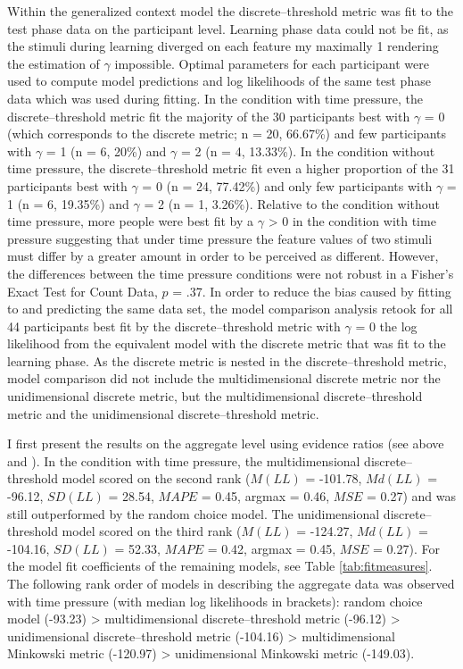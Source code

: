 \documentclass[a4paper,man,natbib]{apa6}
\begin{document}
Within the generalized context model \citep{nosofsky1989further} the discrete--threshold metric was fit to the test phase data on the participant level. Learning phase data could not be fit, as the stimuli during learning diverged on each feature my maximally 1 rendering the estimation of $\gamma$ impossible. Optimal parameters for each participant were used to compute model predictions and log likelihoods of the same test phase data which was used during fitting. In the condition with time pressure, the discrete--threshold metric fit the majority of the 30 participants best with $\gamma$ = 0 (which corresponds to the discrete metric; n = 20, 66.67\%) and few participants with $\gamma$ = 1 (n = 6, 20\%) and $\gamma$ = 2 (n = 4, 13.33\%). In the condition without time pressure, the discrete--threshold metric fit even a higher proportion of the 31 participants best with $\gamma$ = 0 (n = 24, 77.42\%) and only few participants with $\gamma$ = 1 (n = 6, 19.35\%) and $\gamma$ = 2 (n = 1, 3.26\%). Relative to the condition without time pressure, more people were best fit by a $\gamma$ > 0 in the condition with time pressure suggesting that under time pressure the feature values of two stimuli must differ by a greater amount in order to be perceived as different. However, the differences between the time pressure conditions were not robust in a Fisher's Exact Test for Count Data, $p$ = .37. In order to reduce the bias caused by fitting to and predicting the same data set, the model comparison analysis retook for all 44 participants best fit by the discrete--threshold metric with $\gamma$ = 0 the log likelihood from the equivalent model with the discrete metric that was fit to the learning phase. As the discrete metric is nested in the discrete--threshold metric, model comparison did not include the multidimensional discrete metric nor the unidimensional discrete metric, but the multidimensional discrete--threshold metric and the unidimensional discrete--threshold metric. 

I first present the results on the aggregate level using evidence ratios (see above and \citealp{wagenmakers2004aic}). In the condition with time pressure, the multidimensional discrete--threshold model scored on the second rank ($M(LL)$ = -101.78, $Md(LL)$ = -96.12, $SD(LL)$ = 28.54, $MAPE$ = 0.45, argmax = 0.46, $MSE$ = 0.27) and was still outperformed by the random choice model. The unidimensional discrete--threshold model scored on the third rank ($M(LL)$ = -124.27, $Md(LL)$ = -104.16, $SD(LL)$ = 52.33, $MAPE$ = 0.42, argmax = 0.45, $MSE$ = 0.27). For the model fit coefficients of the remaining models, see Table \ref{tab:fitmeasures}. The following rank order of models in describing the aggregate data was observed with time pressure (with median log likelihoods in brackets): random choice model (-93.23) > multidimensional discrete--threshold metric (-96.12) > unidimensional discrete--threshold metric (-104.16) > multidimensional Minkowski metric (-120.97) > unidimensional Minkowski metric (-149.03).
\end{document}
